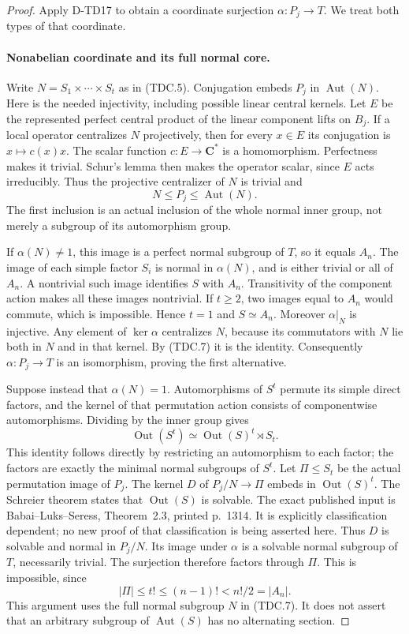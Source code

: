 \begin{proof}
Apply D-TD17 to obtain a coordinate surjection
$\alpha:P_j\to T$. We treat both types of that coordinate.

\paragraph{Nonabelian coordinate and its full normal core.}
Write $N=S_1\times\cdots\times S_t$ as in (TDC.5). Conjugation
embeds $P_j$ in $\operatorname{Aut}(N)$. Here is the needed
injectivity, including possible linear central kernels. Let $E$
be the represented perfect central product of the linear component
lifts on $B_j$. If a local operator centralizes $N$ projectively,
then for every $x\in E$ its conjugation is $x\mapsto c(x)x$.
The scalar function $c:E\to\mathbf C^*$ is a homomorphism.
Perfectness makes it trivial. Schur's lemma then makes the
operator scalar, since $E$ acts irreducibly. Thus the projective
centralizer of $N$ is trivial and
\[
                    N\le P_j\le\operatorname{Aut}(N).
 \tag{TDC.7}
\]
The first inclusion is an actual inclusion of the whole normal
inner group, not merely a subgroup of its automorphism group.

If $\alpha(N)\ne1$, this image is a perfect normal subgroup of
$T$, so it equals $A_n$. The image of each simple factor $S_i$
is normal in $\alpha(N)$, and is either trivial or all of $A_n$.
A nontrivial such image identifies $S$ with $A_n$. Transitivity
of the component action makes all these images nontrivial. If
$t\ge2$, two images equal to $A_n$ would commute, which is
impossible. Hence $t=1$ and $S\simeq A_n$.
Moreover $\alpha|_N$ is injective. Any element of $\ker\alpha$
centralizes $N$, because its commutators with $N$ lie both in
$N$ and in that kernel. By (TDC.7) it is the identity.
Consequently $\alpha:P_j\to T$ is an isomorphism, proving
the first alternative.

Suppose instead that $\alpha(N)=1$. Automorphisms of $S^t$
permute its simple direct factors, and the kernel of that
permutation action consists of componentwise automorphisms.
Dividing by the inner group gives
\[
 \operatorname{Out}(S^t)
       \simeq\operatorname{Out}(S)^t\rtimes S_t.
 \tag{TDC.8}
\]
This identity follows directly by restricting an automorphism
to each factor; the factors are exactly the minimal normal
subgroups of $S^t$. Let $\Pi\le S_t$ be the actual permutation
image of $P_j$. The kernel $D$ of
$P_j/N\to\Pi$ embeds in $\operatorname{Out}(S)^t$.
The Schreier theorem states that $\operatorname{Out}(S)$ is
solvable. The exact published input is Babai--Luks--Seress,
Theorem~2.3, printed p.~1314.\cite{HD:BabaiLuksSeress1997}
It is explicitly classification dependent; no new proof of
that classification is being asserted here.
Thus $D$ is solvable and normal in $P_j/N$. Its image under
$\alpha$ is a solvable normal subgroup of $T$, necessarily
trivial. The surjection therefore factors through $\Pi$.
This is impossible, since
\[
              |\Pi|\le t!\le(n-1)!<n!/2=|A_n|.
 \tag{TDC.9}
\]
This argument uses the full normal subgroup $N$ in (TDC.7).
It does not assert that an arbitrary subgroup of
$\operatorname{Aut}(S)$ has no alternating section.


\end{proof}
